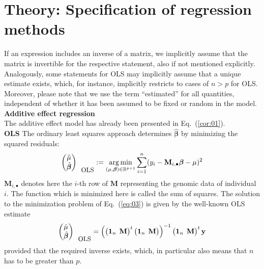 \documentclass{bmcart}
\DeclareMathOperator*{\argmin}{arg\,min}
\newcommand{\M}{\mathbf{M}}
\newcommand{\0}{\mathbf{0}}
\begin{document}
\section*{Theory: Specification of regression methods}
If an expression includes an inverse of a matrix, we implicitly assume that the matrix is invertible for the respective statement, also if not mentioned explicitly. 
Analogously, some statements for OLS may implicitly assume that a unique estimate exists, which, for instance, implicitly restricts to cases of $n>p$ for OLS. Moreover, please note that we use the term ``estimated'' for all quantities, independent of whether it has been assumed to be fixed or random in the model. \vspace{0.4cm} \\
{\bf Additive effect regression}\vspace{0.2cm}\\ 
The additive effect model has already been presented in Eq.~(\ref{cor:01}). \vspace{0.1cm}\\
{\bf OLS} 
The ordinary least squares approach determines $\hat{\bm{\beta}}$ by minimizing the squared residuals: 
\begin{equation}\label{eq:03}
	\begin{pmatrix}
		\hat{\mu} \\
		\hat{\bm{\beta}}
	\end{pmatrix}_{\mbox{\small OLS}} := \argmin_{(\mu,\bm{\beta}) \in \mathbb{R}^{p+1}} \sum\limits_{i=1}^n (y_i - \M_{i,\bullet}\bm{\beta} - \mu)^2
\end{equation}
$\M_{i,\bullet}$ denotes here the $i$-th row of $\M$ representing the genomic data of individual $i$. The function which is minimized here is called the sum of squares. The solution to the minimization problem of Eq.~(\ref{eq:03}) is given by the well-known OLS estimate
\begin{equation}\label{eq:04}
	\begin{pmatrix}
		\hat{\mu} \\
		\hat{\bm{\beta}}
	\end{pmatrix}_{\mbox{\small OLS}} =
	\left( 
	\begin{pmatrix}
		\mathbf{1}_n & \hspace{-0.2cm}\M
	\end{pmatrix}^{t}
	\begin{pmatrix}
		\mathbf{1}_n & \hspace{-0.2cm} \M
	\end{pmatrix} \right)^{-1} 
	\begin{pmatrix}
		\mathbf{1}_n & \hspace{-0.2cm} \M
	\end{pmatrix}^{t}
	\mathbf{y}
\end{equation}
provided that the required inverse exists, which, in particular also means that $n$ has to be greater than $p$.\\
\end{document}
